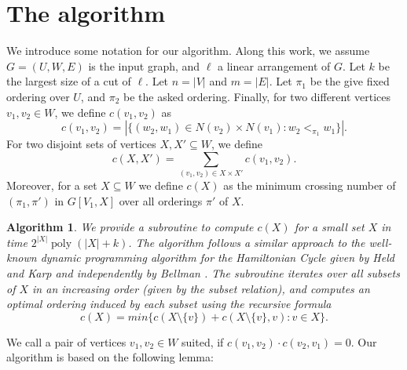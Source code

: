 \documentclass[a4paper,UKenglish,cleveref, autoref, thm-restate]{lipics-v2021}
\newtheorem{algorithm}{Algorithm}
\newcommand{\layerone}{\ensuremath{U}}
\newcommand{\layertwo}{\ensuremath{W}}
\begin{document}
\section{The algorithm}
We introduce some notation for our algorithm. Along this work, we assume $G=(\layerone,\layertwo, E)$ is the input graph, and $\ell$ a linear arrangement of $G$. Let $k$ be the largest size of a cut of $\ell$. Let $n = |V|$ and $m=|E|$.
Let $\pi_1$ be the give fixed ordering over $\layerone$, and $\pi_2$ be the asked ordering.
Finally, for two different vertices $v_1, v_2 \in \layertwo$, we define $c(v_1,v_2)$ as
\[c(v_1,v_2) = |\{(w_2, w_1)\in N(v_2)\times N(v_1)\colon w_2 <_{\pi_1} w_1\}|.\] 
For two disjoint sets of vertices $X,X'\subseteq W$, we define
\[c(X,X') = \sum\limits_{(v_1,v_2)\in X\times X'}c(v_1,v_2).\]
Moreover, for a set $X\subseteq \layertwo$ we define $c(X)$ as the minimum crossing number of $(\pi_1, \pi')$ in $G[V_1, X]$ over all orderings $\pi'$ of $X$.

\begin{algorithm}\label{alg:subroutine}
    We provide a subroutine to compute $c(X)$ for a small set $X$ in time $2^{|X|}\operatorname{poly}(|X|+k)$. The algorithm follows a similar approach to the well-known dynamic programming algorithm for the Hamiltonian Cycle given by Held and Karp \cite{DBLP:conf/acm/HeldK61} and independently by Bellman \cite{bellman1958combinatorial}. The subroutine iterates over all subsets of $X$ in an increasing order (given by the subset relation), and computes an optimal ordering induced by each subset using the recursive formula
    \[c(X) = min\{c(X\setminus\{v\}) + c(X\setminus \{v\}, v)\colon v \in X\}.\]    
\end{algorithm}

We call a pair of vertices $v_1, v_2 \in W$ suited, if $c(v_1,v_2)\cdot c(v_2,v_1) = 0$. Our algorithm is based on the following lemma:
\end{document}
